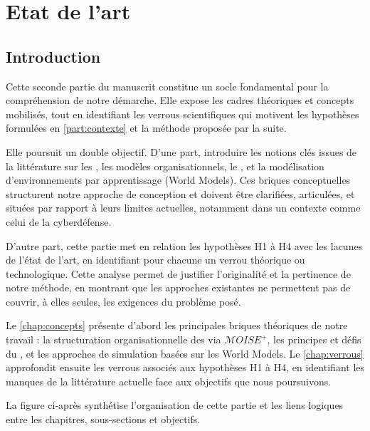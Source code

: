 \cleardoublepage
{}
\part{Etat de l'art}
\label{part:etat_art}

\chapter*{Introduction}

\noindent
Cette seconde partie du manuscrit constitue un socle fondamental pour la compréhension de notre démarche. Elle expose les cadres théoriques et concepts mobilisés, tout en identifiant les verrous scientifiques qui motivent les hypothèses formulées en \autoref{part:contexte} et la méthode proposée par la suite.

Elle poursuit un double objectif. D'une part, introduire les notions clés issues de la littérature sur les , les modèles organisationnels, le , et la modélisation d'environnements par apprentissage (World Models). Ces briques conceptuelles structurent notre approche de conception et doivent être clarifiées, articulées, et situées par rapport à leurs limites actuelles, notamment dans un contexte comme celui de la cyberdéfense.

D'autre part, cette partie met en relation les hypothèses H1 à H4 avec les lacunes de l'état de l'art, en identifiant pour chacune un verrou théorique ou technologique. Cette analyse permet de justifier l'originalité et la pertinence de notre méthode, en montrant que les approches existantes ne permettent pas de couvrir, à elles seules, les exigences du problème posé.

Le \autoref{chap:concepts} présente d'abord les principales briques théoriques de notre travail : la structuration organisationnelle des  via $\mathcal{M}OISE^+$, les principes et défis du , et les approches de simulation basées sur les World Models. Le \autoref{chap:verrous} approfondit ensuite les verrous associés aux hypothèses H1 à H4, en identifiant les manques de la littérature actuelle face aux objectifs que nous poursuivons.

La figure ci-après synthétise l'organisation de cette partie et les liens logiques entre les chapitres, sous-sections et objectifs.


